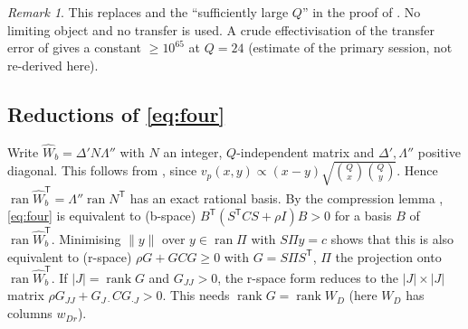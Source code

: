 \documentclass[11pt]{amsart}
\theoremstyle{remark}
\newtheorem{remark}[theorem]{Remark}
\newcommand{\Wh}{\widehat W}
\begin{document}
\begin{remark}
This replaces \cite[(3certificate), (4certificate), Lemma~5.2, Prop.~5.3]{OAI} and the
``sufficiently large $Q$'' in the proof of \cite[Thm.~1.1]{OAI}. No limiting object and no transfer
is used. A crude effectivisation of the transfer error of \cite[Lemma~5.2]{OAI} gives a constant $\ge10^{65}$ at $Q=24$ (estimate of the primary session, not re-derived here).
\end{remark}

\subsection*{Reductions of \eqref{eq:four}}
Write $\Wh_b=\Delta'N\Lambda''$ with $N$ an integer, $Q$-independent matrix and $\Delta',\Lambda''$ positive diagonal.
This follows from \cite[eq.~(pair)]{OAI}, since $v_p(x,y)\propto(x-y)\sqrt{\binom Qx\binom Qy}$.
Hence $\operatorname{ran}\Wh_b^{\mathsf T}=\Lambda''\operatorname{ran}N^{\mathsf T}$ has an exact rational basis.
By the compression lemma \cite[Lemma~5.1]{OAI}, \eqref{eq:four} is equivalent to
(b-space) $B^{\mathsf T}(S^{\mathsf T}CS+\rho I)B>0$ for a basis $B$ of $\operatorname{ran}\Wh_b^{\mathsf T}$.
Minimising $\|y\|$ over $y\in\operatorname{ran}\Pi$ with $S\Pi y=c$ shows that this is also equivalent to
(r-space) $\rho G+GCG\ge0$ with $G=S\Pi S^{\mathsf T}$, $\Pi$ the projection onto $\operatorname{ran}\Wh_b^{\mathsf T}$.
If $|J|=\operatorname{rank}G$ and $G_{JJ}>0$, the r-space form reduces to the $|J|\times|J|$ matrix
$\rho G_{JJ}+G_{J\cdot}CG_{\cdot J}>0$. This needs $\operatorname{rank}G=\operatorname{rank}W_D$ (here $W_D$ has columns $w_{Dr}$).
\end{document}
